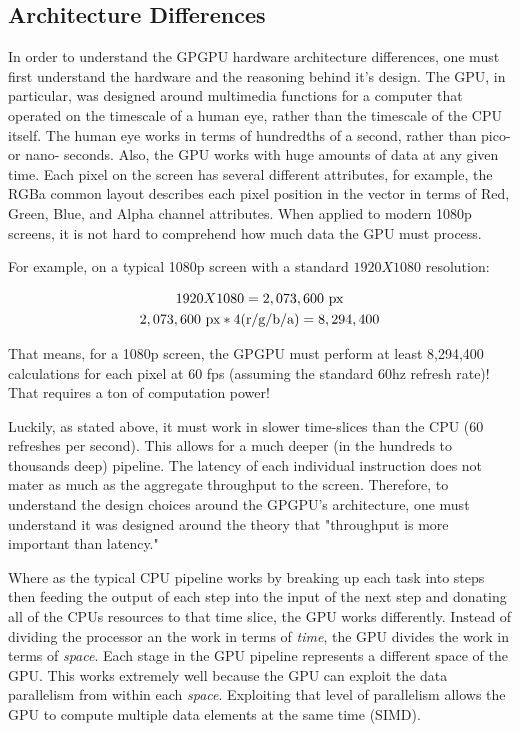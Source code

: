 \subsection*{Architecture Differences}

In order to understand the GPGPU hardware architecture differences, one must first understand the hardware and the reasoning behind it's design. The GPU, in particular, was designed around multimedia functions for a computer that operated on the timescale of a human eye, rather than the timescale of the CPU itself. The human eye works in terms of hundredths of a second, rather than pico- or nano- seconds. Also, the GPU works with huge amounts of data at any given time. Each pixel on the screen has several different attributes, for example, the RGBa common layout describes each pixel position in the vector in terms of Red, Green, Blue, and Alpha channel attributes. When applied to modern 1080p screens, it is not hard to comprehend how much data the GPU must process. \cite{gpucomputing}

For example, on a typical 1080p screen with a standard $1920 X 1080$ resolution:
\begin{center}
\begin{gather}
1920 X 1080 = 2,073,600 \text{ px} \notag \\
2,073,600 \text{ px} * 4 \text{(r/g/b/a)} =  8,294,400 \notag
\end{gather}
\end{center}

That means, for a 1080p screen, the GPGPU must perform at least 8,294,400 calculations for each pixel at 60 fps (assuming the standard 60hz refresh rate)! That requires a ton of computation power! 

Luckily, as stated above, it must work in slower time-slices than the CPU (60 refreshes per second). This allows for a much deeper (in the hundreds to thousands deep) pipeline. The latency of each individual instruction does not mater as much as the aggregate throughput to the screen. Therefore, to understand the design choices around the GPGPU's architecture, one must understand it was designed around the theory that "throughput is more important than latency." \cite{gpucomputing}

Where as the typical CPU pipeline works by breaking up each task into steps then feeding the output of each step into the input of the next step and donating all of the CPUs resources to that time slice, the GPU works differently. Instead of dividing the processor an the work in terms of \textit{time}, the GPU divides the work in terms of \textit{space}. Each stage in the GPU pipeline represents a different space of the GPU. This works extremely well because the GPU can exploit the data parallelism from within each \textit{space}. \cite{gpucomputing} Exploiting that level of parallelism allows the GPU to compute multiple data elements at the same time (SIMD). 

